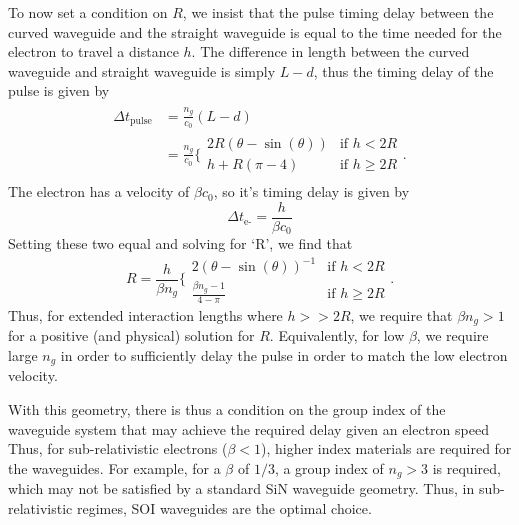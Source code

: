 To now set a condition on $R$, we insist that the pulse timing delay between the curved waveguide and the straight waveguide is equal to the time needed for the electron to travel a distance $h$.
The difference in length between the curved waveguide and straight waveguide is simply $L-d$, thus the timing delay of the pulse is given by
\begin{align}
\begin{split}
 \Delta t_{\textrm{pulse}} &= \frac{n_g}{c_0}(L-d)\\
     &= \frac{n_g}{c_0}\Bigg\{
 \begin{array}{ll}
  2R(\theta-\sin(\theta))   &\text{if } h < 2R \\
  h + R(\pi-4)     &\text{if } h \geq 2R
 \end{array}.
 \end{split}
\end{align}
The electron has a velocity of $\beta c_0$, so it's timing delay is given by 
\begin{equation}
\Delta t_{\textrm{e-}} = \frac{h}{\beta c_0}
\end{equation}
Setting these two equal and solving for `R', we find that
\begin{equation}
    R = \frac{h}{\beta n_g}\Bigg\{
 \begin{array}{ll}
  2(\theta-\sin(\theta))^{-1}    &\text{if } h < 2R \\
  \frac{\beta n_g - 1}{4-\pi}   &\text{if } h \geq 2R
 \end{array}.
\end{equation}
Thus, for extended interaction lengths where $h >> 2R$, we require that $\beta n_g > 1$ for a positive (and physical) solution for $R$. Equivalently, for low $\beta$, we require large $n_g$ in order to sufficiently delay the pulse in order to match the low electron velocity.

With this geometry, there is thus a condition on the group index of the waveguide system that may achieve the required delay given an electron speed
%
%
Thus, for sub-relativistic electrons ($\beta < 1$), higher index materials are required for the waveguides.
For example, for a $\beta$ of $1/3$, a group index of $n_g > 3$ is required, which may not be satisfied by a standard SiN waveguide geometry.
Thus, in sub-relativistic regimes, SOI waveguides are the optimal choice.


